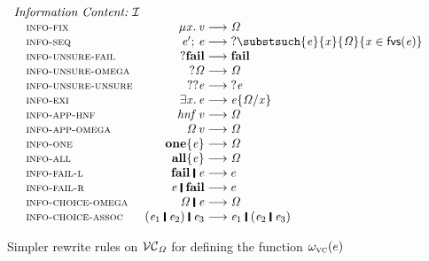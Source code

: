 \begin{figure}
 $
  \begin{array}{l}
\begin{array}{@{\quad}lr@{\;}c@{\;}l@{\qquad}l@{}}
  \rulegroupname{Information Content:~$\rinfo${}}
  \rulename{info-fix} & \ensuremath{\mu\Varid{x}.\,\Varid{v}} & \movesto & \ensuremath{\mathit{\Omega}} \\
  \rulename{info-seq} & \ensuremath{\Varid{e'};\,\Varid{e}} & \movesto & ?\substsuch{\ensuremath{\Varid{e}}}{\ensuremath{\Varid{x}}}{\ensuremath{\mathit{\Omega}}}{\ensuremath{\Varid{x}} \in \freevars{\ensuremath{\Varid{e}}}} \\
  \rulename{info-unsure-fail} & \ensuremath{\mathbin{?}\textbf{fail}} & \movesto & \ensuremath{\textbf{fail}} \\
  \rulename{info-unsure-omega} & \ensuremath{\mathbin{?}\mathit{\Omega}} & \movesto & \ensuremath{\mathit{\Omega}} \\
  \rulename{info-unsure-unsure} & \ensuremath{\mathbin{??}\Varid{e}} & \movesto & \ensuremath{\mathbin{?}\Varid{e}} \\
  \rulename{info-exi} & \ensuremath{\exists\Varid{x}.\,\Varid{e}} & \movesto & \ensuremath{\subst{\Varid{e}}{\Varid{x}}{\mathit{\Omega}}} \\
  \rulename{info-app-hnf} & \ensuremath{\mathit{hnf}\,\Varid{v}} & \movesto & \ensuremath{\mathit{\Omega}} \\
  \rulename{info-app-omega} & \ensuremath{\mathit{\Omega}\,\Varid{v}} & \movesto & \ensuremath{\mathit{\Omega}} \\
  \rulename{info-one} & \ensuremath{\textbf{one}\{\Varid{e}\}} & \movesto & \ensuremath{\mathit{\Omega}} \\
  \rulename{info-all} & \ensuremath{\textbf{all}\{\Varid{e}\}} & \movesto & \ensuremath{\mathit{\Omega}} \\
  \rulename{info-fail-l} & \ensuremath{\textbf{fail}\;\rule[-0.1em]{0.15em}{0.75em}\;\Varid{e}} & \movesto & e \\
  \rulename{info-fail-r} & \ensuremath{\Varid{e}\;\rule[-0.1em]{0.15em}{0.75em}\;\textbf{fail}} & \movesto & e \\
  \rulename{info-choice-omega} & \ensuremath{\mathit{\Omega}\;\rule[-0.1em]{0.15em}{0.75em}\;\Varid{e}} & \movesto & \ensuremath{\mathit{\Omega}} \\
  \rulename{info-choice-assoc} & \ensuremath{(\Varid{e}_{\mathrm{1}}\;\rule[-0.1em]{0.15em}{0.75em}\;\Varid{e}_{\mathrm{2}})\;\rule[-0.1em]{0.15em}{0.75em}\;\Varid{e}_{\mathrm{3}}} & \movesto & \ensuremath{\Varid{e}_{\mathrm{1}}\;\rule[-0.1em]{0.15em}{0.75em}\;(\Varid{e}_{\mathrm{2}}\;\rule[-0.1em]{0.15em}{0.75em}\;\Varid{e}_{\mathrm{3}})} \\
\end{array}
\end{array}
$
\caption{Simpler rewrite rules on $\mathcal{VC}_\mathit{\Omega}$ for defining the function $\omega_{\scriptscriptstyle\mathrm{VC}}(e)$}\label{fig:info-simpler-rewrite-rules}
\end{figure}


